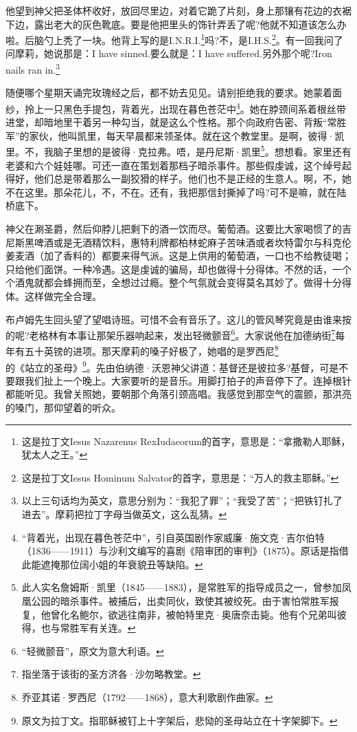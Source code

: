\par 他望到神父把圣体杯收好，放回尽里边，对着它跪了片刻，身上那镶有花边的衣裾下边，露出老大的灰色靴底。要是他把里头的饰针弄丢了呢?他就不知道该怎么办啦。后脑勺上秃了一块。他背上写的是I.N.R.I.\footnote{这是拉丁文Iesus Nazarenus RexIudaeorum的首字，意思是：“拿撒勒人耶稣，犹太人之王。”}吗?不，是I.H.S.\footnote{这是拉丁文Iesus Hominum Salvator的首字，意思是：“万人的救主耶稣。”}。有一回我问了问摩莉，她说那是：I have sinned.要么就是：I have suffered.另外那个呢?Iron nails ran in.\footnote{以上三句话均为英文，意思分别为：“我犯了罪”；“我受了苦”；“把铁钉扎了进去”。摩莉把拉丁字母当做英文，这么乱猜。}
\par 随便哪个星期天诵完玫瑰经之后，都不妨去见见。请别拒绝我的要求。她蒙着面纱，拎上一只黑色手提包，背着光，出现在暮色苍茫中\footnote{“背着光，出现在暮色苍茫中”，引自英国剧作家威廉·施文克·吉尔伯特（1836——1911）与沙利文编写的喜剧《陪审团的审判》（1875）。原话是指借此能遮掩那位阔小姐的年衰貌丑等缺陷。}。她在脖颈间系着根丝带进堂，却暗地里干着另一种勾当，就是这么个性格。那个向政府告密、背叛“常胜军”的家伙，他叫凯里，每天早晨都来领圣体。就在这个教堂里。是啊，彼得·凯里。不，我脑子里想的是彼得·克拉弗。唔，是丹尼斯·凯里\footnote{此人实名詹姆斯·凯里（1845——1883），是常胜军的指导成员之一，曾参加凤凰公园的暗杀事件。被捕后，出卖同伙，致使其被绞死。由于害怕常胜军报复，他曾化名鲍尔，欲逃往南非，被帕特里克·奥唐奈击毙。他有个兄弟叫彼得，也与常胜军有关连。}。想想看。家里还有老婆和六个娃娃哪。可还一直在策划着那档子暗杀事件。那些假虔诚，这个绰号起得好，他们总是带着那么一副狡猾的样子。他们也不是正经的生意人。啊，不，她不在这里。那朵花儿，不，不在。还有，我把那信封撕掉了吗?可不是嘛，就在陆桥底下。
\par 神父在涮圣爵，然后仰脖儿把剩下的酒一饮而尽。葡萄酒。这要比大家喝惯了的吉尼斯黑啤酒或是无酒精饮料，惠特利牌都柏林蛇麻子苦味酒或者坎特雷尔与科克伦姜麦酒（加了香料的）都要来得气派。这是上供用的葡萄酒，一口也不给教徒喝；只给他们面饼。一种冷遇。这是虔诚的骗局，却也做得十分得体。不然的话，一个个酒鬼就都会蜂拥而至，全想过过瘾。整个气氛就会变得莫名其妙了。做得十分得体。这样做完全合理。
\par 布卢姆先生回头望了望唱诗班。可惜不会有音乐了。这儿的管风琴究竟是由谁来按的呢?老格林有本事让那架乐器响起来，发出轻微颤音\footnote{“轻微颤音”，原文为意大利语。}。大家说他在加德纳街\footnote{指坐落于该街的圣方济各·沙勿略教堂。}每年有五十英镑的进项。那天摩莉的嗓子好极了，她唱的是罗西尼\footnote{乔亚其诺·罗西尼（1792——1868），意大利歌剧作曲家。}的《站立的圣母》\footnote{原文为拉丁文。指耶稣被钉上十字架后，悲恸的圣母站立在十字架脚下。}。先由伯纳德·沃恩神父讲道：基督还是彼拉多?基督，可是不要跟我们扯上一个晚上。大家要听的是音乐。用脚打拍子的声音停下了。连掉根针都能听见。我曾关照她，要朝那个角落引颈高唱。我感觉到那空气的震颤，那洪亮的嗓门，那仰望着的听众。

